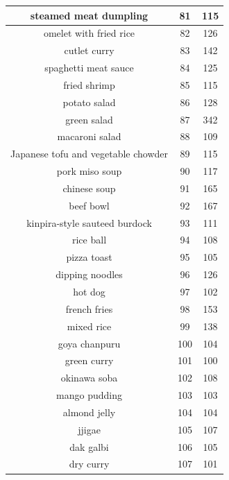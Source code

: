 {\begin{longtable}{| c | c | c|}
        \hline
        steamed meat dumpling  &  81  &  115  \\
        \hline
        omelet with fried rice  &  82  &  126  \\
        \hline
        cutlet curry  &  83  &  142  \\
        \hline
        spaghetti meat sauce  &  84  &  125  \\
        \hline
        fried shrimp  &  85  &  115  \\
        \hline
        potato salad  &  86  &  128  \\
        \hline
        green salad  &  87  &  342  \\
        \hline
        macaroni salad  &  88  &  109  \\
        \hline
        Japanese tofu and vegetable chowder  &  89  &  115  \\
        \hline
        pork miso soup  &  90  &  117  \\
        \hline
        chinese soup  &  91  &  165  \\
        \hline
        beef bowl  &  92  &  167  \\
        \hline
        kinpira-style sauteed burdock  &  93  &  111  \\
        \hline
        rice ball  &  94  &  108  \\
        \hline
        pizza toast  &  95  &  105  \\
        \hline
        dipping noodles  &  96  &  126  \\
        \hline
        hot dog  &  97  &  102  \\
        \hline
        french fries  &  98  &  153  \\
        \hline
        mixed rice  &  99  &  138  \\
        \hline
        goya chanpuru  &  100  &  104  \\
        \hline
        green curry  &  101  &  100  \\
        \hline
        okinawa soba  &  102  &  108  \\
        \hline
        mango pudding  &  103  &  103  \\
        \hline
        almond jelly  &  104  &  104  \\
        \hline
        jjigae  &  105  &  107  \\
        \hline
        dak galbi  &  106  &  105  \\
        \hline
        dry curry  &  107  &  101  \\

\end{longtable}}
